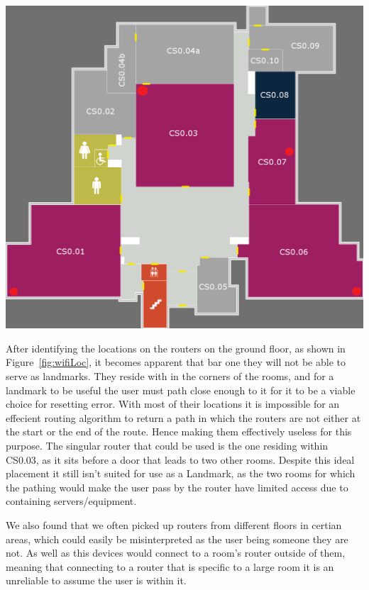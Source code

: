 \documentclass[main.tex]{subfiles}
\begin{document}
\begin{center}
\includegraphics[scale=0.3]{images-implementation/wifiLocation.png}
\label{fig:wifiLoc}
\end{center}

After identifying the locations on the routers on the ground floor, as shown in Figure~\ref{fig:wifiLoc}, it becomes apparent that bar one they will not be able to serve as landmarks. They reside with in the corners of the rooms, and for a landmark to be useful the user must path close enough to it for it to be a viable choice for resetting error. With most of their locations it is impossible for an effecient routing algorithm to return a path in which the routers are not either at the start or the end of the route. Hence making them effectively useless for this purpose. The singular router that could be used is the one residing within CS0.03, as it sits before a door that leads to two other rooms. Despite this ideal placement it still isn't suited for use as a Landmark, as the two rooms for which the pathing would make the user pass by the router have limited access due to containing servers/equipment.

We also found that we often picked up routers from different floors in certian areas, which could easily be misinterpreted as the user being someone they are not. As well as this devices would connect to a room's router outside of them, meaning that connecting to a router that is specific to a large room it is an unreliable to assume the user is within it.
\end{document}
